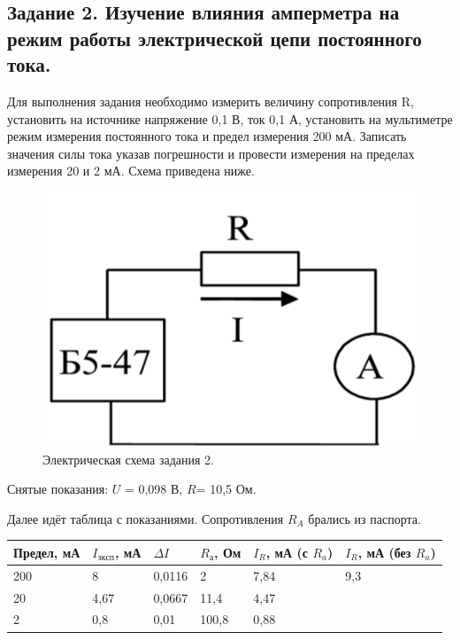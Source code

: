 \documentclass[a4paper,12pt]{article}
\begin{document}
\newpage

\subsection{Задание 2. Изучение влияния амперметра на режим работы
электрической цепи постоянного тока.}

\hspace{\parindent}Для выполнения задания необходимо измерить величину
сопротивления R, установить на источнике напряжение 0,1 В, ток 0,1 А,
установить на мультиметре режим измерения постоянного тока и предел
измерения 200 мА. Записать значения
силы тока указав погрешности и провести измерения на пределах измерения
20 и 2 мА. Схема приведена ниже.

\begin{figure}[h!]
	\begin{center}
		\includegraphics[scale=0.8]{scheme_2.png}
	\end{center}
	\caption{Электрическая схема задания 2.}
\end{figure}

Снятые показания: $U$ = 0,098 В, $R$= 10,5 Ом. 

Далее идёт таблица с показаниями. Сопротивления $R_A$ брались из паспорта. 

\begin{table}[!ht]
    \centering
    \begin{tabular}{|l|l|l|l|l|l|}
    \hline
        Предел, мА & $I_{эксп}$, мА & $\Delta I$ & $R_{а}$, Ом & $I_{R}$, мА (с $R_{a}$) & $I_R$, мА (без $R_a$) \\ \hline
        200 & 8 & 0,0116 & 2 & 7,84 & 9,3 \\ \hline
        20 & 4,67 & 0,0667 & 11,4 & 4,47 & ~ \\ \hline
        2 & 0,8 & 0,01 & 100,8 & 0,88 & ~ \\ \hline
    \end{tabular}
\end{table}
\end{document}
